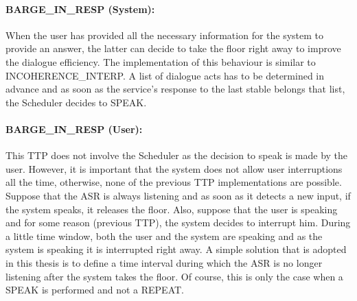 			\paragraph{BARGE\_IN\_RESP (System):} When the user has provided all the necessary information for the system to provide an answer, the latter can decide to take the floor right away to improve the dialogue efficiency. The implementation of this behaviour is similar to INCOHERENCE\_INTERP. A list of dialogue acts has to be determined in advance and as soon as the service's response to the last stable belongs that list, the Scheduler decides to SPEAK.
			
			\paragraph{BARGE\_IN\_RESP (User):} This TTP does not involve the Scheduler as the decision to speak is made by the user. However, it is important that the system does not allow user interruptions all the time, otherwise, none of the previous TTP implementations are possible. Suppose that the ASR is always listening and as soon as it detects a new input, if the system speaks, it releases the floor. Also, suppose that the user is speaking and for some reason (previous TTP), the system decides to interrupt him. During a little time window, both the user and the system are speaking and as the system is speaking it is interrupted right away. A simple solution that is adopted in this thesis is to define a time interval during which the ASR is no longer listening after the system takes the floor. Of course, this is only the case when a SPEAK is performed and not a REPEAT.
